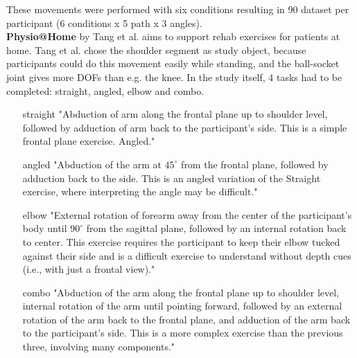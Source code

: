 These movements were performed with six conditions resulting in 90 dataset per participant (6 conditions x 5 path x 3 angles).\\
\textbf{Physio@Home} by Tang et al. \cite{Tang2015} aims to support rehab exercises for patients at home. Tang et al. chose the shoulder segment as study object, because participants could do this movement easily while standing, and the ball-socket joint gives more DOFs than e.g. the knee. In the study itself, 4 tasks had to be completed: straight, angled, elbow and combo.
\begin{itemize}
	\item[straight] "Abduction of arm along the frontal plane up to shoulder level, followed by adduction of arm back to the participant’s side. This is a simple frontal plane exercise.
	Angled."
	\item[angled] "Abduction of the arm at $45^\circ$ from the frontal plane, followed by adduction back to the side. This is an angled variation of the Straight exercise, where interpreting the angle may be difficult."
	\item[elbow] "External rotation of forearm away from the center of the participant’s body until $90^\circ$ from the sagittal plane, followed by an internal rotation back to center. This exercise requires the participant to keep their elbow tucked against their side and is a difficult exercise to understand without depth cues (i.e., with just a frontal view)."
	\item[combo] "Abduction of the arm along the frontal plane up to shoulder level, internal rotation of the arm until pointing forward, followed by an external rotation of the arm back to the frontal plane, and adduction of the arm back to the participant’s side. This is a more complex exercise than the previous three, involving many components."
\end{itemize}


